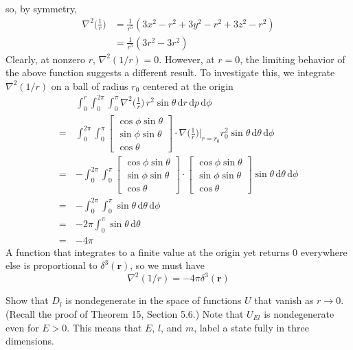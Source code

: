 \documentclass[../principles-of-quantum-mechanics.tex]{subfiles}
\begin{document}
\begin{questions}
\begin{solution}
			so, by symmetry,
			\begin{align*}
				\nabla^2\Big(\frac{1}{r}\Big) &= \frac{1}{r^5}(3x^2 - r^2 + 3y^2 - r^2 + 3z^2 - r^2) \\
				&= \frac{1}{r^5}(3r^2 - 3r^2)
			\end{align*}
			Clearly, at nonzero $r$, $\nabla^2(1/r) = 0$. However, at $r = 0$, the limiting behavior of the above function suggests a different result. To investigate this, we integrate $\nabla^2(1/r)$ on a ball of radius $r_0$ centered at the origin
			\begin{align*}
				&\int_0^r \int_0^{2\pi}\int_0^{\pi}\nabla^2\Big(\frac{1}{r}\Big)\,r^2\sin\theta\,\mathrm{d}r\,\mathrm{d}p\,\mathrm{d}\phi \\
				=\,&\int_0^{2\pi}\int_0^{\pi}\begin{bmatrix}\cos\phi\sin\theta \\ \sin\phi\sin\theta \\ \cos\theta\end{bmatrix}\cdot\nabla\Big(\frac{1}{r}\Big)\Big|_{r=r_0}r_0^2\sin\theta\,\mathrm{d}\theta\,\mathrm{d}\phi \\
				=\,&-\int_0^{2\pi}\int_0^{\pi}\begin{bmatrix}\cos\phi\sin\theta \\ \sin\phi\sin\theta \\ \cos\theta\end{bmatrix}\cdot\begin{bmatrix}\cos\phi\sin\theta \\ \sin\phi\sin\theta \\ \cos\theta\end{bmatrix}\sin\theta\,\mathrm{d}\theta\,\mathrm{d}\phi \\
				=\,&-\int_0^{2\pi}\int_0^{\pi}\sin\theta\,\mathrm{d}\theta\,\mathrm{d}\phi \\
				=\,&{-2\pi}\int_0^\pi\sin\theta\,\mathrm{d}\theta \\
				=\,&{-4\pi}
			\end{align*}
			A function that integrates to a finite value at the origin yet returns $0$ everywhere else is proportional to $\delta^3(\mathbf{r})$, so we must have
			$$\nabla^2(1/r) = -4\pi\delta^3(\mathbf{r})$$
		\end{solution}
	
		\question Show that $D_l$ is nondegenerate in the space of functions $U$ that vanish as $r\to 0$. (Recall the proof of Theorem 15, Section 5.6.) Note that $U_{El}$ is nondegenerate even for $E>0$. This means that $E$, $l$, and $m$, label a state fully in three dimensions.
		
		\begin{solution}
			
		\end{solution}
	\end{questions}
\end{document}
